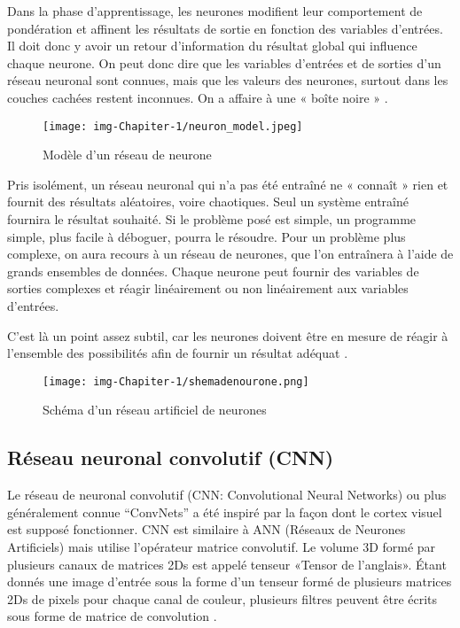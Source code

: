 \documentclass[12pt]{article}
\begin{document}
Dans la phase d'apprentissage, les neurones modifient leur comportement de pondération et affinent les résultats de sortie en fonction des variables d'entrées. Il doit donc y avoir un retour d'information du résultat global qui influence chaque neurone. On peut donc dire que les variables d'entrées et de sorties d'un réseau neuronal sont connues, mais que les valeurs des neurones, surtout dans les couches cachées restent inconnues. On a affaire à une « boîte noire » \cite{10}.

\begin{figure}[h]
	\centering
	\texttt{[image: img-Chapiter-1/neuron\_model.jpeg]}
	\caption{Modèle d'un réseau de neurone}
\end{figure}

Pris isolément, un réseau neuronal qui n’a pas été entraîné ne « connaît » rien et fournit des résultats aléatoires, voire chaotiques. Seul un système entraîné fournira le résultat souhaité. Si le problème posé est simple, un programme simple, plus facile à déboguer, pourra le résoudre. Pour un problème plus complexe, on aura recours à un réseau de neurones, que l’on entraînera à l’aide de grands ensembles de données. Chaque neurone peut fournir des variables de sorties complexes et réagir linéairement ou non linéairement aux variables d'entrées.

C'est là un point assez subtil, car les neurones doivent être en mesure de réagir à l’ensemble des possibilités afin de fournir un résultat adéquat \cite{10}.
\begin{figure}[h]
\centering
\texttt{[image: img-Chapiter-1/shemadenourone.png]}
\caption{Schéma d’un réseau artificiel de neurones}
\end{figure}

\subsection{Réseau neuronal convolutif (CNN)}
Le réseau de neuronal convolutif (CNN: Convolutional Neural Networks) ou plus généralement connue “ConvNets” a été inspiré par la façon dont le cortex visuel est supposé fonctionner. CNN est similaire à ANN (Réseaux de Neurones Artificiels) mais utilise l’opérateur matrice convolutif. Le volume 3D formé par plusieurs canaux de matrices 2Ds est appelé tenseur «Tensor de l’anglais». Étant donnés une image d'entrée sous la forme d'un tenseur formé de plusieurs matrices 2Ds de pixels pour chaque canal de couleur, plusieurs filtres peuvent être écrits sous forme de matrice de convolution \cite{42}.
\end{document}
